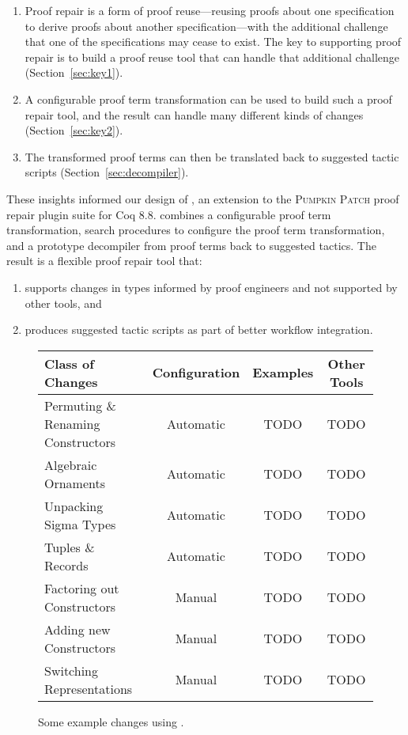 \begin{enumerate}
\item Proof repair is a form of proof reuse---reusing proofs about one specification to derive proofs about another specification---with 
the additional challenge that one of the specifications may cease to exist.
The key to supporting proof repair is to build a proof reuse
tool that can handle that additional challenge (Section~\ref{sec:key1}). 
\item A configurable proof term transformation can be used to build such a proof repair tool,
and the result can handle many different kinds of changes (Section~\ref{sec:key2}).
\item The transformed proof terms can then be translated back to suggested tactic scripts (Section~\ref{sec:decompiler}).
\end{enumerate}

These insights informed our design of \toolname, an extension to the \textsc{Pumpkin Patch} proof repair plugin suite for Coq 8.8.
\toolname combines a configurable proof term transformation,
search procedures to configure the proof term transformation,
and a prototype decompiler from proof terms back to suggested tactics.
The result is a flexible proof repair tool that: 

\begin{enumerate}
\item supports changes in types informed by proof engineers and not supported by other tools, and
\item produces suggested tactic scripts as part of better workflow integration.
\end{enumerate}

\begin{figure*}
\small
  \begin{tabular}{|l|c|c|c|}
    \hline
    \textbf{Class of Changes} & \textbf{Configuration} & \textbf{Examples} & \textbf{Other Tools} \\
    \hline
    Permuting \& Renaming Constructors & Automatic & TODO & TODO\\
    Algebraic Ornaments & Automatic & TODO & TODO\\
    Unpacking Sigma Types & Automatic & TODO & TODO\\
    Tuples \& Records & Automatic & TODO & TODO\\
    Factoring out Constructors & Manual & TODO & TODO\\
    Adding new Constructors & Manual & TODO & TODO\\
    Switching Representations & Manual & TODO & TODO\\
    \hline
  \end{tabular}
  \caption{Some example changes using \toolname.}
\label{fig:changes}
\end{figure*}

